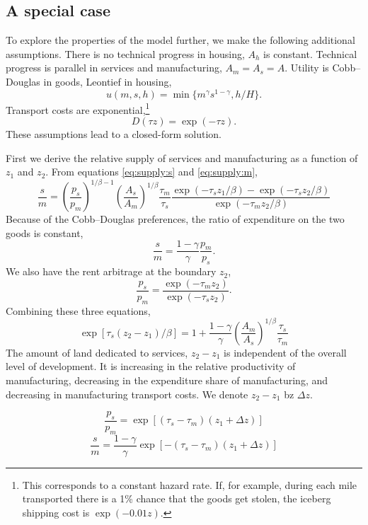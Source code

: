 \documentclass[12pt]{article}
\begin{document}
\subsection{A special case}
To explore the properties of the model further, we make the following additional assumptions.
There is no technical progress in housing, $A_h$ is constant. Technical progress is parallel in services and manufacturing, $A_m=A_s=A$. Utility is Cobb--Douglas in goods, Leontief in housing,
\[
u(m,s,h) = \min\{m^\gamma s^{1-\gamma} ,h/H\}.
\]
Transport costs are exponential,\footnote{This corresponds to a constant hazard rate. If, for example, during each mile transported there is a 1\% chance that the goods get stolen, the iceberg shipping cost is $\exp(-0.01 z)$.}
\[
D(\tau z) = \exp(-\tau z).
\]
These assumptions lead to a closed-form solution.

First we derive the relative supply of services and manufacturing as a function of $z_1$ and $z_2$. From equations \eqref{eq:supply:s} and \eqref{eq:supply:m},
\begin{equation}
 \frac{s}{m} = \left(\frac{p_s}{p_m}\right)^{1/\beta-1}
\left(\frac{A_s}{A_m}\right)^{1/\beta} 
\frac{\tau_m}{\tau_s}
\frac{\exp(-\tau_s z_1/\beta)-\exp(-\tau_s z_2/\beta)}{\exp(-\tau_m z_2/\beta)}
\end{equation}
Because of the Cobb--Douglas preferences, the ratio of expenditure on the two goods is constant,
\begin{equation}
 \frac{s}{m} = \frac{1-\gamma}{\gamma}\frac{p_m}{p_s}.
\end{equation}
We also have the rent arbitrage at the boundary $z_2$,
\begin{equation}
 \frac{p_s}{p_m}  = \frac{\exp(-\tau_m z_2)}{\exp(-\tau_s z_2)}.
\end{equation}
Combining these three equations,
\begin{equation}
\exp\left[\tau_s(z_2-z_1)/\beta\right] = 1+\frac{1-\gamma}{\gamma}\left(\frac{A_m}{A_s}\right)^{1/\beta}\frac{\tau_s}{\tau_m} 
\end{equation}
The amount of land dedicated to services, $z_2-z_1$ is independent of the overall level of development. It is increasing in the relative productivity of manufacturing, decreasing in the expenditure share of manufacturing, and decreasing in manufacturing transport costs. We denote $z_2-z_1$ bz $\Delta z$.

\begin{equation}
 \frac{p_s}{p_m} = \exp\left[(\tau_s-\tau_m)(z_1+\Delta z)\right]
\end{equation}
\begin{equation}
 \frac{s}{m} = \frac{1-\gamma}{\gamma}\exp\left[-(\tau_s-\tau_m)(z_1+\Delta z)\right]
\end{equation}
 
\end{document}
